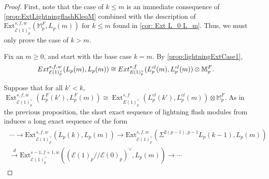 \documentclass[10pt,a4paper]{amsart}
\DeclareMathOperator{\Ext}{Ext}
\newcommand{\cE}{{\mathcal E}}
\newcommand{\mF}{{\mathbb F}}
\newcommand{\mM}{{\mathbb M}}
\begin{document}
\begin{proof}
    First, note that the case of $k \leq m$ is an immediate consequence of \cref{prop:ExtLightningflashKleqM} combined with the description of  $\text{Ext}_{\mathcal{E}(1)^\vee_p}^{s,f,w}(\mM_p^F, L_p(m))$ for $k \le m$ found in \cref{cor: Ext L_0 L_m}. Thus, we must only prove the case of $k>m$. 

Fix an $m \ge 0$, and start with the base case $k=m$. By \cref{prop:lightningExtCase1},
\[
\textup{Ext}_{\mathcal{E}(1)^\vee_p}^{s,f,w}(L_p(m), L_p(m)) \cong \textup{Ext}_{{E}(1)^\vee_p}^{s,f}(L^{cl}_p(m), L^{cl}_p(m)) \otimes \mM_{p}^{F}.
\]

Suppose that for all $k' < k$, $\Ext_{\cE(1)_p^\vee}^{s,f,w}(L_p^F (k'), L_p^F (m)) \cong \Ext_{E(1)_p^\vee}^{s,f}(L_p^{cl}(k'), L_p^{cl} (m)) \otimes \mM_{p}^{F}$. 
As in the previous proposition, the short exact sequence of lightning flash modules from  induces a long exact sequence of the form
\begin{align}
    \label{eq:LESLightningFlashExtKgeqM}
    \begin{split}
        \cdots \to \text{Ext}^{s,f,w}_{\mathcal{E}(1)^\vee_p}(L_p (k), L_p (m)) \to \text{Ext}^{s,f,w}_{\mathcal{E}(1)^\vee_p}(\Sigma^{2(p-1), p-1}L_p (k-1), L_p (m)) \\
        \xrightarrow{d}\text{Ext}^{s-1,f+1,w}_{\mathcal{E}(1)^\vee_p}((\mathcal{E}(1)_p//\mathcal{E}(0)_p)^\vee, L_p(m)) \to \cdots
    \end{split}
\end{align}


\end{proof}
\end{document}
